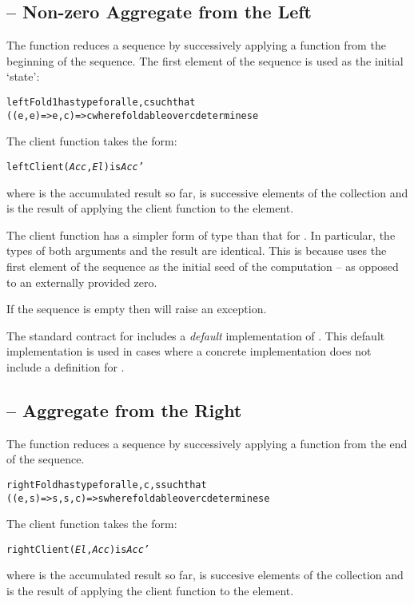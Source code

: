 \subsection{ -- Non-zero Aggregate from the Left}
\label{leftFold1}
The  function reduces a sequence by successively applying a function from the beginning of the sequence. The first element of the sequence is used as the initial `state':
\begin{alltt}
leftFold1 has type for all e,c such that
    ((e,e)=>e,c) => c where foldable over c determines e
\end{alltt}
The client function takes the form:
\begin{alltt}
leftClient(\emph{Acc},\emph{El}) is \emph{Acc'}
\end{alltt}
where  is the accumulated result so far,  is successive elements of the collection and  is the result of applying the client function to the element.

\begin{aside}
The client function has a simpler form of type than that for . In particular, the types of both arguments and the result are identical. This is because  uses the first element of the sequence as the initial seed of the computation -- as opposed to an externally provided zero.
\end{aside}

\begin{aside}
If the sequence is empty then  will raise an exception.
\end{aside}

\begin{aside}
The standard contract for  includes a \emph{default} implementation of . This default implementation is used in cases where a concrete implementation does not include a definition for .
\end{aside}

\subsection{ -- Aggregate from the Right}
\label{rightFold}
The  function reduces a sequence by successively applying a function from the end of the sequence.
\begin{alltt}
rightFold has type for all e,c,s such that
    ((e,s)=>s,s,c) => s where foldable over c determines e
\end{alltt}
The client function takes the form:
\begin{alltt}
rightClient(\emph{El},\emph{Acc}) is \emph{Acc'}
\end{alltt}
where  is the accumulated result so far,  is succesive elements of the collection and  is the result of applying the client function to the element.

